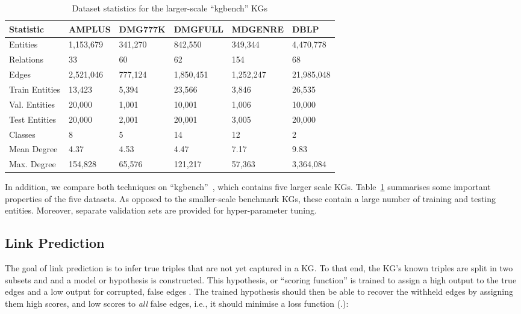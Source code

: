 \documentclass{llncs}
\begin{document}
\setlength{\tabcolsep}{3pt}
\begin{table}[h!]
\begin{center}
 
\begin{tabular}{llllll}\toprule
 \textbf{Statistic}          &  \textbf{AMPLUS} &  \textbf{DMG777K}   &  \textbf{DMGFULL} &  \textbf{MDGENRE} &  \textbf{DBLP}\\\midrule
Entities  &  1,153,679  & 341,270  & 842,550 & 349,344 & 4,470,778 \\
Relations  & 33  & 60  & 62 & 154 & 68  \\
Edges  & 2,521,046 & 777,124 & 1,850,451 & 1,252,247 & 21,985,048 \\
Train Entities  & 13,423 & 5,394 & 23,566 & 3,846 & 26,535  \\
Val. Entities  & 20,000 & 1,001 & 10,001 & 1,006 & 10,000 \\
Test Entities  & 20,000 & 2,001 & 20,001 & 3,005 & 20,000 \\
Classes  & 8  & 5  & 14 & 12 & 2 \\
Mean Degree & 4.37 & 4.53 & 4.47 & 7.17 & 9.83 \\
Max. Degree & 154,828 & 65,576 & 121,217 & 57,363 & 3,364,084 \\ \bottomrule
\end{tabular}
\end{center}
\caption{Dataset statistics for the larger-scale ``kgbench'' KGs\label{table:statistics2}}
\end{table}

In addition, we compare both techniques on ``kgbench''~\cite{bloem2021kgbench}, which contains five larger scale KGs. Table~\ref{table:statistics2} summarises some important properties of the five datasets. As opposed to the smaller-scale benchmark KGs, these contain a large number of training and testing entities. Moreover, separate validation sets are provided for hyper-parameter tuning.

\subsection{Link Prediction}
The goal of link prediction is to infer true triples that are not yet captured in a KG. To that end, the KG's known triples are split in two subsets  and  and a model or hypothesis  is constructed. This hypothesis, or ``scoring function'' is trained to assign a high output to the true edges  and a low output for corrupted, false edges .
The trained hypothesis should then be able to recover the withheld edges  by assigning them high scores, and low scores to \textit{all} false edges, i.e., it should minimise a loss function (.):
\end{document}
